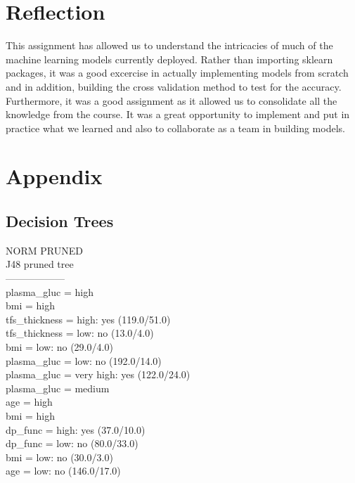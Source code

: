 \documentclass[12pt]{article}
\begin{document}
\newpage
{}
{}
\section*{Reflection}
This assignment has allowed us to understand the intricacies of much of the machine learning models currently deployed. Rather than importing sklearn packages, it was a good excercise in actually implementing models from scratch and in addition, building the cross validation method to test for the accuracy. Furthermore, it was a good assignment as it allowed us to consolidate all the knowledge from the course. It was a great opportunity to implement and put in practice what we learned and also to collaborate as a team in building models.

\newpage
{}
{}
\section*{Appendix}

\subsection*{Decision Trees}

NORM PRUNED  \\
J48 pruned tree  \\
------------------ \\
plasma\_gluc = high \\
\textbar \quad bmi = high \\
\textbar\quad   \textbar\quad   tfs\_thickness = high: yes (119.0/51.0) \\
\textbar\quad   \textbar\quad   tfs\_thickness = low: no (13.0/4.0) \\
\textbar\quad   bmi = low: no (29.0/4.0) \\
plasma\_gluc = low: no (192.0/14.0) \\ 
plasma\_gluc = very high: yes (122.0/24.0) \\
plasma\_gluc = medium \\
\textbar\quad   age = high \\
\textbar\quad   \textbar\quad   bmi = high \\ 
\textbar\quad   \textbar\quad   \textbar\quad   dp\_func = high: yes (37.0/10.0) \\ 
\textbar\quad   \textbar\quad   \textbar\quad   dp\_func = low: no (80.0/33.0) \\ 
\textbar\quad   \textbar\quad   bmi = low: no (30.0/3.0) \\ 
\textbar\quad   age = low: no (146.0/17.0) \\
\end{document}
